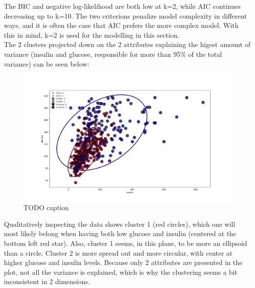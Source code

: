 The BIC and negative log-likelihood are both low at k=2, while AIC continues
decreasing up to k=10. The two criterions penalize model complexity in different ways,
and it is often the case that AIC prefers the more complex model. With this in mind,
k=2 is used for the modelling in this section.\\
The 2 clusters projected down on the 2 attributes explaining the higest amount
of variance (insulin and glucose, responsible for more than 95\% of the total
variance) can be seen below:\\
\begin{figure}[htb]
  \centering
  \includegraphics[width=\textwidth]{Figure_2.png}
  \caption{TODO caption}
\end{figure}
Qualitatively inspecting the data shows cluster 1 (red circles), which one
will most likely belong when having both low glucose and insulin (centered
at the bottom left red star). Also, cluster 1 seems, in this plane, to be more
an ellipsoid than a circle. Cluster 2 is more spread out and more circular, with
center at higher glucose and insulin levels.
Because only 2 attributes are presented in the plot, not all the variance is
explained, which is why the clustering seems a bit inconsistent in 2 dimensions.

